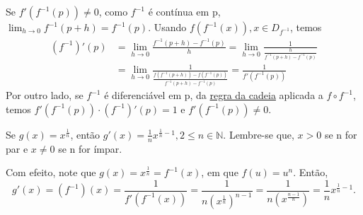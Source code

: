 \documentclass[analysis_notes.tex]{subfiles}
\begin{document}
\begin{proof*}
	Se \(f'(f^{-1}(p))\neq0\), como \(f^{-1}\) é contínua em p, \(\lim_{h\to 0}f^{-1}(p+h)=f^{-1}(p)\).
	Usando \(f(f^{-1}(x)), x\in D_{f^{-1}}\), temos
	\begin{align*}
		(f^{-1})'(p) & = \lim_{h\to 0}\frac{f^{-1}(p+h)-f^{-1}(p)}{h} = \lim_{h\to 0}\frac{1}{\frac{h}{f^{-1}(p+h)-f^{-1}(p)}}      \\
		             & = \lim_{h\to 0}\frac{1}{\frac{f(f^{-1}(p+h))-f(f^{-1}(p))}{f^{-1}(p+h)-f^{-1}(p)}} = \frac{1}{f'(f^{-1}(p))}
	\end{align*}
	Por outro lado, se \(f^{-1}\) é diferenciável em p, da \hyperlink{chain_rule}{regra da cadeia}
	aplicada a \(f\circ{f^{-1}}\), temos \(f'(f^{-1}(p))\cdot (f^{-1})'(p)=1\) e \(f'(f^{-1}(p))\neq0\).
\end{proof*}
\begin{example}
	Se \(g(x)=x^{\frac{1}{n}}\), então \(g'(x) = \frac{1}{n}x^{\frac{1}{n}-1}, 2\leq n\in \mathbb{N}\).
	Lembre-se que, \(x > 0\) se n for par e \(x\neq0\) se n for ímpar.

	Com efeito, note que \(g(x) = x^{\frac{1}{n}} = f^{-1}(x)\), em que \(f(u) = u^n.\) Então,
	\[
		g'(x) = (f^{-1})(x) = \frac{1}{f'(f^{-1}(x))} = \frac{1}{n(x^{\frac{1}{n}})^{n-1}} = \frac{1}{n(x^{\frac{n-1}{n}})} = \frac{1}{n}x^{\frac{1}{n}-1}.
	\]
\end{example}
\end{document}
